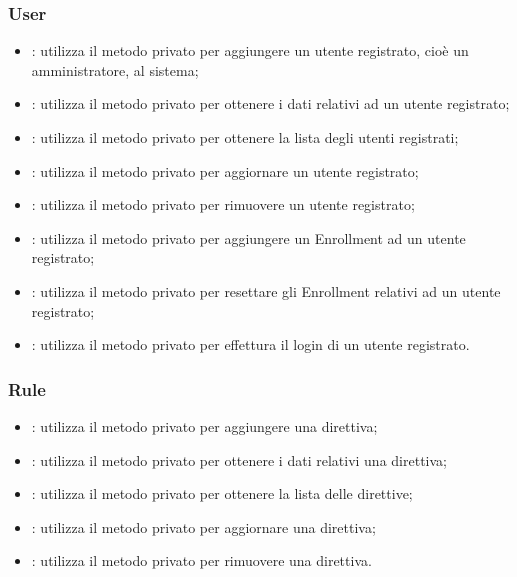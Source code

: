 \subsubsection{User}
\begin{itemize}
\item {}: utilizza il metodo privato  per aggiungere un utente registrato, cioè un amministratore, al sistema;

\item {}: utilizza il metodo privato  per ottenere i dati relativi ad un utente registrato;

\item {}: utilizza il metodo privato  per ottenere la lista degli utenti registrati; 

\item {}: utilizza il metodo privato  per aggiornare un utente registrato;

\item {}: utilizza il metodo privato  per rimuovere un utente registrato;

\item {}: utilizza il metodo privato  per aggiungere un Enrollment ad un utente registrato;

\item {}: utilizza il metodo privato  per resettare gli Enrollment relativi ad un utente registrato;

\item {}: utilizza il metodo privato  per effettura il login di un utente registrato.

\end{itemize}
\subsubsection{Rule}
\begin{itemize}
\item {}: utilizza il metodo privato  per aggiungere una direttiva;

\item {}: utilizza il metodo privato  per ottenere i dati relativi una direttiva;

\item {}: utilizza il metodo privato  per ottenere la lista delle direttive;

\item {}: utilizza il metodo privato  per aggiornare una direttiva;

\item {}: utilizza il metodo privato  per rimuovere una direttiva.


\end{itemize}
